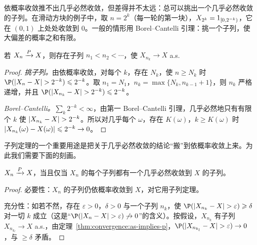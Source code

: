 依概率收敛推不出几乎必然收敛，但差得并不太远：总可以挑出一个几乎必然收敛的子列。在滑动方块的例子中，取 $n=2^k$（每一轮的第一块），$X_{2^k}=1_{[0,2^{-k})}$，它在 $(0,1)$ 上处处收敛到 $0$。一般的情形用 Borel--Cantelli 引理：挑一个子列，使大偏差的概率之和有限。

\begin{theorem}[子列定理]\label{thm:convergence:subsequence}
若 $X_n\xrightarrow{P} X$，则存在子列 $n_1<n_2<\cdots$，使 $X_{n_k}\to X$ a.s.
\end{theorem}
\begin{proof}
\emph{挑子列。}由依概率收敛，对每个 $k$，存在 $N_k$，使 $n\geqslant N_k$ 时 $\P(\abs{X_n-X}>2^{-k})\leqslant2^{-k}$。取 $n_1=N_1$，$n_k=\max\{N_k,n_{k-1}+1\}$，则 $n_k$ 严格递增，并且 $\P(\abs{X_{n_k}-X}>2^{-k})\leqslant2^{-k}$。

\emph{Borel--Cantelli。}$\sum_k2^{-k}<\infty$，由第一 Borel--Cantelli 引理，几乎必然地只有有限个 $k$ 使 $\lvert X_{n_k}-X\rvert>2^{-k}$。所以对几乎每个 $\omega$，存在 $K(\omega)$，$k\geqslant K(\omega)$ 时 $\lvert X_{n_k}(\omega)-X(\omega)\rvert\leqslant2^{-k}\to0$。
\end{proof}

子列定理的一个重要用途是把关于几乎必然收敛的结论“搬”到依概率收敛上来。为此我们需要下面的刻画。

\begin{theorem}[依概率收敛的子列刻画]\label{thm:convergence:subsequence-criterion}
$X_n\xrightarrow{P} X$，当且仅当 $X_n$ 的每个子列都有一个几乎必然收敛到 $X$ 的子列。
\end{theorem}
\begin{proof}
必要性：$X_n$ 的子列仍依概率收敛到 $X$，对它用子列定理。

充分性：如若不然，存在 $\varepsilon>0$，$\delta>0$ 与一个子列 $n_k$，使 $\P(\abs{X_{n_k}-X}>\varepsilon)\geqslant\delta$ 对一切 $k$ 成立（这是“$\P(\abs{X_n-X}>\varepsilon)\not\to0$”的含义）。按假设，$X_{n_k}$ 有子列 $X_{n_{k_l}}\to X$ a.s.，由定理~\ref{thm:convergence:as-implies-p}，$\P(\abs{X_{n_{k_l}}-X}>\varepsilon)\to0$，与 $\geqslant\delta$ 矛盾。
\end{proof}

